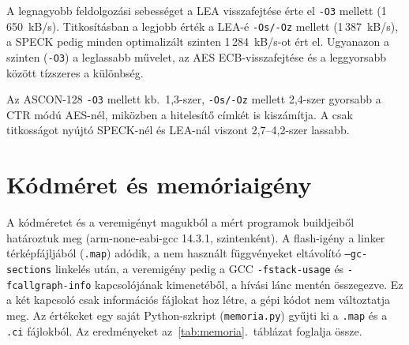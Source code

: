 \documentclass[a4paper,12pt]{report}
\theoremstyle{definition}
\theoremstyle{remark}
\begin{document}
A legnagyobb feldolgozási sebességet a LEA visszafejtése érte el \texttt{-O3} mellett (1\,650~kB/s). Titkosításban a legjobb érték a LEA-é \texttt{-Os/-Oz} mellett (1\,387~kB/s), a SPECK pedig minden optimalizált szinten 1\,284~kB/s-ot ért el. Ugyanazon a szinten (\texttt{-O3}) a leglassabb művelet, az AES ECB-visszafejtése és a leggyorsabb között tízszeres a különbség.

Az ASCON-128 \texttt{-O3} mellett kb.\ 1,3-szer, \texttt{-Os/-Oz} mellett 2,4-szer gyorsabb a CTR módú AES-nél, miközben a hitelesítő címkét is kiszámítja. A csak titkosságot nyújtó SPECK-nél és LEA-nál viszont 2,7--4,2-szer lassabb.

\section{Kódméret és memóriaigény}\label{sec:memoria}

A kódméretet és a veremigényt magukból a mért programok buildjeiből határoztuk meg (arm-none-eabi-gcc 14.3.1, szintenként). A flash-igény a linker térképfájljából (\texttt{.map}) adódik, a nem használt függvényeket eltávolító \texttt{--gc-sections} linkelés után, a veremigény pedig a GCC \texttt{-fstack-usage} és \texttt{-fcallgraph-info} kapcsolójának kimenetéből, a hívási lánc mentén összegezve. Ez a két kapcsoló csak információs fájlokat hoz létre, a gépi kódot nem változtatja meg. Az értékeket egy saját Python-szkript (\texttt{memoria.py}) gyűjti ki a \texttt{.map} és a \texttt{.ci} fájlokból.
Az eredményeket az~\ref{tab:memoria}.~táblázat foglalja össze.
\end{document}
